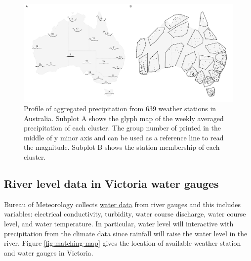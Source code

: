 \documentclass[
]{jss}
\begin{document}
\begin{CodeChunk}
\begin{figure}

{\centering \includegraphics[width=1\linewidth]{figures/basic-agg} 

}

\caption[Profile of aggregated precipitation from 639 weather stations in Australia]{Profile of aggregated precipitation from 639 weather stations in Australia. Subplot A shows the glyph map of the weekly averaged precipitation of each cluster. The group number of printed in the middle of y minor axis and can be used as a reference line to read the magnitude. Subplot B shows the station membership of each cluster.}\label{fig:basic-agg}
\end{figure}
\end{CodeChunk}

\hypertarget{river-level-data-in-victoria-water-gauges}{%
\subsection{River level data in Victoria water
gauges}\label{river-level-data-in-victoria-water-gauges}}

Bureau of Meteorology collects
\href{http://www.bom.gov.au/metadata/catalogue/19115/ANZCW0503900528?template=full}{water
data} from river gauges and this includes variables: electrical
conductivity, turbidity, water course discharge, water course level, and
water temperature. In particular, water level will interactive with
precipitation from the climate data since rainfall will raise the water
level in the river. Figure \ref{fig:matching-map} gives the location of
available weather station and water gauges in Victoria.
\end{document}
